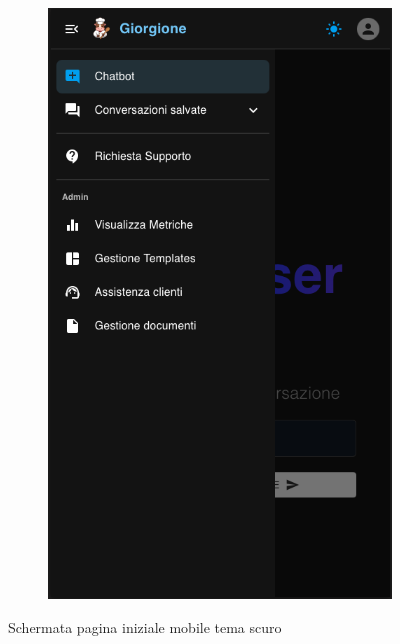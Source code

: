 \begin{figure}[h!]
\begin{subfigure}{0.3\textwidth}
        \includegraphics[width=\textwidth]{./img/layoutResponsive2Black.png}
    \end{subfigure}
    \caption{Schermata pagina iniziale mobile tema scuro}
\end{figure}